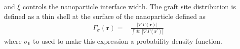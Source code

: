 \documentclass{article}
\begin{document}
    and $\xi$ controls the nanoparticle interface width.
  The graft site distribution is defined as a thin shell at the surface of the
    nanoparticle defined as
  \begin{align*}
    \Gamma_\sigma(\mathbf{r}) 
    =&
      \frac{| \nabla \Gamma(\mathbf{r}) |}
           {\int d \mathbf{r^\prime} | \nabla \Gamma(\mathbf{r^\prime}) | }
  \end{align*}
  where $\sigma_0 $ to used to make this expression a probability density function. 
  
\end{document}

